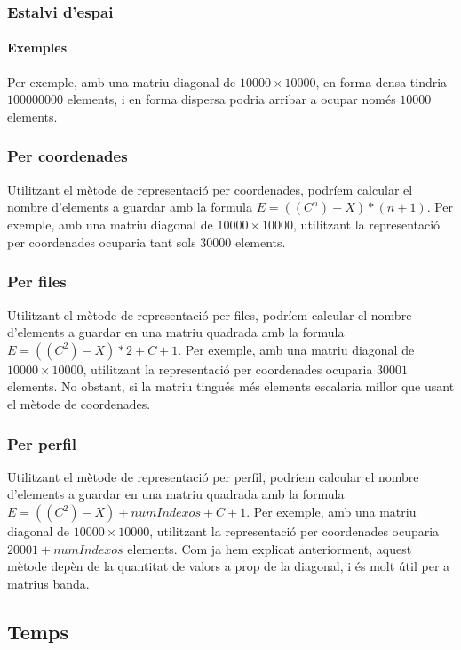 \documentclass[8pt]{beamer}
\begin{document}
\begin{frame}
  \frametitle{Estalvi d'espai}
  \framesubtitle{Exemples}
Per exemple, amb una matriu diagonal de $10000 \times 10000$, en forma densa tindria $100000000$ elements, i en forma dispersa podria arribar a ocupar només $10000$ elements. \\
\subsubsection{Per coordenades}

Utilitzant el mètode de representació per coordenades, podríem calcular el nombre d'elements a guardar amb la formula $E=((C^n)-X)*(n+1)$.
Per exemple, amb una matriu diagonal de $10000 \times 10000$, utilitzant la representació per coordenades ocuparia tant sols $30000$ elements. \\

\subsubsection{Per files}

Utilitzant el mètode de representació per files, podríem calcular el nombre d'elements a guardar en una matriu quadrada  amb la formula $E=((C^2)-X)*2+C+1$.
Per exemple, amb una matriu diagonal de $10000 \times 10000$, utilitzant la representació per coordenades ocuparia $30001$ elements. No obstant, si la matriu tingués més elements
escalaria millor que usant el mètode de coordenades. \\

\subsubsection{Per perfil}

Utilitzant el mètode de representació per perfil, podríem calcular el nombre d'elements a guardar en una matriu quadrada  amb la formula $E=((C^2)-X)+numIndexos+C+1$.
Per exemple, amb una matriu diagonal de $10000 \times 10000$, utilitzant la representació per coordenades ocuparia $20001+numIndexos$ elements. Com ja hem explicat anteriorment, aquest mètode depèn de la quantitat de valors a prop de la diagonal, i és molt útil per a matrius banda. \\
\end{frame}
\subsection{Temps}
\end{document}
